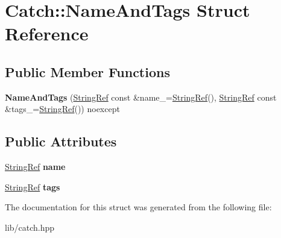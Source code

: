 \hypertarget{struct_catch_1_1_name_and_tags}{}\section{Catch\+:\+:Name\+And\+Tags Struct Reference}
\label{struct_catch_1_1_name_and_tags}
\subsection*{Public Member Functions}
\begin{DoxyCompactItemize}
\item 
\mbox{\label{struct_catch_1_1_name_and_tags_ab585111e615ce8c504a2b9630de8ee94}} 
{\bfseries Name\+And\+Tags} (\mbox{\hyperlink{class_catch_1_1_string_ref}{String\+Ref}} const \&name\+\_\+=\mbox{\hyperlink{class_catch_1_1_string_ref}{String\+Ref}}(), \mbox{\hyperlink{class_catch_1_1_string_ref}{String\+Ref}} const \&tags\+\_\+=\mbox{\hyperlink{class_catch_1_1_string_ref}{String\+Ref}}()) noexcept
\end{DoxyCompactItemize}
\subsection*{Public Attributes}
\begin{DoxyCompactItemize}
\item 
\mbox{\label{struct_catch_1_1_name_and_tags_a7cbea60e0cebfa622c667008eb011420}} 
\mbox{\hyperlink{class_catch_1_1_string_ref}{String\+Ref}} {\bfseries name}
\item 
\mbox{\label{struct_catch_1_1_name_and_tags_a74062ed1138834a348424eb7ed900c57}} 
\mbox{\hyperlink{class_catch_1_1_string_ref}{String\+Ref}} {\bfseries tags}
\end{DoxyCompactItemize}


The documentation for this struct was generated from the following file\+:\begin{DoxyCompactItemize}
\item 
lib/catch.\+hpp\end{DoxyCompactItemize}
